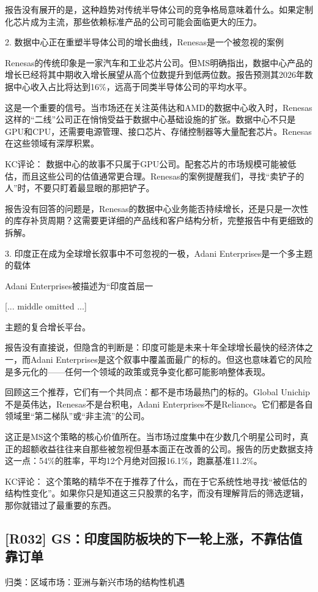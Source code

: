 \documentclass[11pt]{ctexart}
\begin{document}
报告没有展开的是，这种趋势对传统半导体公司的竞争格局意味着什么。如果定制化芯片成为主流，那些依赖标准产品的公司可能会面临更大的压力。

2. 数据中心正在重塑半导体公司的增长曲线，Renesas是一个被忽视的案例

Renesas的传统印象是一家汽车和工业芯片公司。但MS明确指出，数据中心产品的增长已经将其中期收入增长展望从高个位数提升到低两位数。报告预测其2026年数据中心收入占比将达到16\%，远高于同类半导体公司的平均水平。

这是一个重要的信号。当市场还在关注英伟达和AMD的数据中心收入时，Renesas这样的“二线”公司正在悄悄受益于数据中心基础设施的扩张。数据中心不只是GPU和CPU，还需要电源管理、接口芯片、存储控制器等大量配套芯片。Renesas在这些领域有深厚积累。

KC评论： 数据中心的故事不只属于GPU公司。配套芯片的市场规模可能被低估，而且这些公司的估值通常更合理。Renesas的案例提醒我们，寻找“卖铲子的人”时，不要只盯着最显眼的那把铲子。

报告没有回答的问题是，Renesas的数据中心业务能否持续增长，还是只是一次性的库存补货周期？这需要更详细的产品线和客户结构分析，完整报告中有更细致的拆解。

3. 印度正在成为全球增长叙事中不可忽视的一极，Adani Enterprises是一个多主题的载体

Adani Enterprises被描述为“印度首屈一

[... middle omitted ...]

主题的复合增长平台。

报告没有直接说，但隐含的判断是：印度可能是未来十年全球增长最快的经济体之一，而Adani Enterprises是这个叙事中覆盖面最广的标的。但这也意味着它的风险是多元化的——任何一个领域的政策或竞争变化都可能影响整体表现。

回顾这三个推荐，它们有一个共同点：都不是市场最热门的标的。Global Unichip不是英伟达，Renesas不是台积电，Adani Enterprises不是Reliance。它们都是各自领域里“第二梯队”或“非主流”的公司。

这正是MS这个策略的核心价值所在。当市场过度集中在少数几个明星公司时，真正的超额收益往往来自那些被忽视但基本面正在改善的公司。报告的历史数据支持这一点：54\%的胜率，平均12个月绝对回报16.1\%，跑赢基准11.2\%。

KC评论： 这个策略的精华不在于推荐了什么，而在于它系统性地寻找“被低估的结构性变化”。如果你只是知道这三只股票的名字，而没有理解背后的筛选逻辑，那你就错过了最重要的东西。

\subsection{[R032] GS：印度国防板块的下一轮上涨，不靠估值靠订单}
{\small\color{refgray}归类：区域市场：亚洲与新兴市场的结构性机遇}
\end{document}
